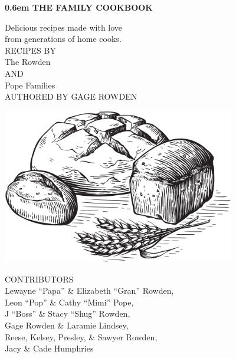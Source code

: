 \documentclass{cookbook}
\begin{document}
\clearpage
\newcommand\nbvspace[1][3]{\vspace*{\stretch{#1}}}
\newcommand{\nbtitlestretch}{\spaceskip0.6em}
\pagestyle{empty}
\begin{center}
\bfseries
\nbvspace[1]
\Huge
{\nbtitlestretch\huge
THE FAMILY COOKBOOK}

\nbvspace[1]
\normalsize

Delicious recipes made with love\\
from generations of home cooks.\\

\nbvspace[1]
\small RECIPES BY\\
\Large The Rowden\\
\medskip\small AND\\
\Large Pope Families\\
\medskip\footnotesize AUTHORED BY GAGE ROWDEN

\nbvspace[3]

\includegraphics[width=4in]{images/bread.png}
\nbvspace[2]
\normalsize

CONTRIBUTORS\\
\small
Lewayne ``Papa'' \& Elizabeth ``Gran'' Rowden,\\
Leon ``Pop'' \& Cathy ``Mimi'' Pope,\\
J ``Boss'' \& Stacy ``Shug'' Rowden,\\
Gage Rowden \& Laramie Lindsey,\\
Reese, Kelsey, Presley, \& Sawyer Rowden,\\
Jacy \& Cade Humphries

\nbvspace[1]
\end{center}
\end{document}

